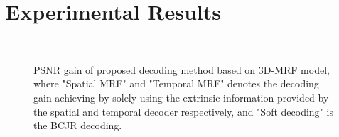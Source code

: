 \documentclass[10pt,twocolumn,twoside]{IEEEtran}
\begin{document}
\section{Experimental Results}\label{sec_exp}
\begin{figure}
\centering
{}
\\
\caption{PSNR gain of proposed decoding method based on 3D-MRF model, where "Spatial MRF" and "Temporal MRF" denotes the decoding gain achieving by solely using the extrinsic information provided by the spatial and temporal decoder respectively, and "Soft decoding" is the BCJR decoding.}
\label{fig_result}
\end{figure}
\end{document}
